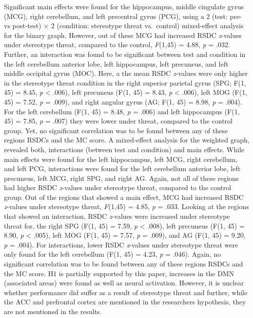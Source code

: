 \documentclass[
  stu,floatsintext]{apa7}
\begin{document}
Significant main effects were found for the hippocampus, middle cingulate gyrus (MCG), right cerebellum, and left precentral gyrus (PCG), using a 2 (test: pre- vs post-test) \(\times\) 2 (condition: stereotype threat vs.~control) mixed-effect analysis for the binary graph.
However, out of these MCG had increased RSDC \emph{z}-values under stereotype threat, compared to the control, \emph{F}(1,45) = 4.88, \emph{p} = .032.
Further, an interaction was found to be significant between test and condition in the left cerebellum anterior lobe, left hippocampus, left precuneus, and left middle occipital gyrus (MOC).
Here, a the mean RSDC \emph{z}-values were only higher in the stereotype threat condition in the right superior parietal gyrus (SPG; F(1, 45) = 8.45, \emph{p} \textless{} .006), left precuneus (F(1, 45) = 8.43, \emph{p} \textless{} .006), left MOG (F(1, 45) = 7.52, \emph{p} = .009), and right angular gyrus (AG; F(1, 45) = 8.98, \emph{p} = .004).
For the left cerebellum (F(1, 45) = 8.48, \emph{p} = .006) and left hippocampus (F(1, 45) = 7.85, \emph{p} = .007) they were lower under threat, compared to the control group.
Yet, no significant correlation was to be found between any of these regions RSDCs and the MC score.
A mixed-effect analysis for the weighted graph, revealed both, interactions (between test and condition) and main effects.
While main effects were found for the left hippocampus, left MCG, right cerebellum, and left PCG, interactions were found for the left cerebellum anterior lobe, left precuneus, left MCG, right SPG, and right AG.
Again, not all of these regions had higher RSDC \emph{z}-values under stereotype threat, compared to the control group.
Out of the regions that showed a main effect, MCG had increased RSDC \emph{z}-values under stereotype threat, \emph{F}(1,45) = 4.85, \emph{p} = .033.
Looking at the regions that showed an interaction, RSDC \emph{z}-values were increased under stereotype threat for, the right SPG (F(1, 45) = 7.59, \emph{p} \textless{} .008), left precuneus (F(1, 45) = 8.90, \emph{p} \textless{} .005), left MOG (F(1, 45) = 7.57, \emph{p} = .009), and AG (F(1, 45) = 9.20, \emph{p} = .004).
For interactions, lower RSDC \emph{z}-values under stereotype threat were only found for the left cerebellum (F(1, 45) = 4.23, \emph{p} = .046).
Again, no significant correlation was to be found between any of these regions RSDCs and the MC score.
H1 is partially supported by this paper, increases in the DMN (associated areas) were found as well as neural activation. However, it is unclear whether performance did suffer as a result of stereotype threat and further, while the ACC and prefrontal cortex are mentioned in the researchers hypothesis, they are not mentioned in the results.
\end{document}
